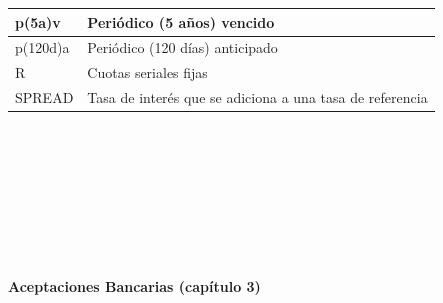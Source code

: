 \begin{spacing}{1}
\begin{center}
\begin{tabular}{ |p{2.5cm}|p{9.5cm}|}
p(5a)v & Periódico (5 años) vencido \\ \hline 

p(120d)a & Periódico (120 días) anticipado  \\ \hline  

R & Cuotas seriales fijas  \\ \hline

SPREAD & Tasa de interés que se adiciona a una tasa de referencia \\ \hline




 
\end{tabular}
\end{center}
\end{spacing}
\ \ \
\\ \\ \\ \\ \\ \\ \\
\begin{center} \textbf {Aceptaciones Bancarias (capítulo 3)}\\ \end{center} 

